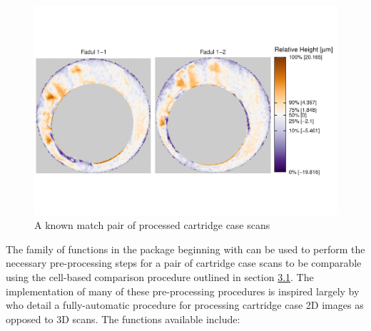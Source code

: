 \begin{Schunk}
\begin{figure}[htbp]

{\centering \includegraphics[width=1.2\textwidth,trim={0 2.5cm 0 2cm}]{cmcR_files/figure-latex/unnamed-chunk-5-1} 

}

\caption{\label{fig:processedScans} A known match pair of processed cartridge case scans}\label{fig:unnamed-chunk-5}
\end{figure}
\end{Schunk}

The family of functions in the  package beginning with
 can be used to perform the necessary pre-processing
steps for a pair of cartridge case scans to be comparable using the
cell-based comparison procedure outlined in section
\protect\hyperlink{comparisonProcedure}{3.1}. The implementation of many
of these pre-processing procedures is inspired largely by
\citet{tai_fully_2018} who detail a fully-automatic procedure for
processing cartridge case 2D images as opposed to 3D scans. The
functions available include:


